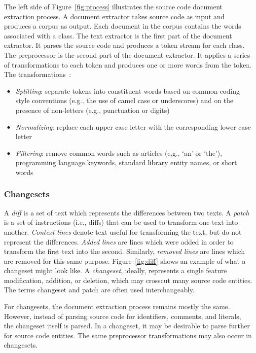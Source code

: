 The left side of Figure~\ref{fig:process} illustrates the source code document extraction process.
A document extractor takes source code as input and produces a corpus as output.
Each document in the corpus contains the words associated with a class.
The text extractor is the first part of the document extractor.
It parses the source code and produces a token stream for each class.
The preprocessor is the second part of the document extractor.
It applies a series of transformations to each token and
produces one or more words from the token.
The transformations~\cite{Marcus-etal:2004,Marcus-Menzies:2010}: %
\begin{itemize}
    \item {\it Splitting}: separate tokens into constituent words
        based on common coding style conventions (e.g., the use of camel case or underscores)
        and on the presence of non-letters (e.g., punctuation or digits)
    \item {\it Normalizing}: replace each upper case letter with the corresponding
        lower case letter
    \item {\it Filtering}: remove common words such as articles (e.g., `an' or `the'),
        programming language keywords, standard library entity names, or short words
\end{itemize}


\subsubsection{Changesets}

A \textit{diff} is a set of text which represents the differences between two texts.
A \textit{patch} is a set of instructions (i.e., diffs) that can be used to transform one text into another.
\textit{Context lines} denote text useful for transforming the text, but do not represent the differences.
\textit{Added lines} are lines which were added in order to transform the first text into the second.
Similarly, \textit{removed lines} are lines which are removed for this same purpose.
Figure~\ref{fig:diff} shows an example of what a changeset might look like.
A \textit{changeset}, ideally, represents a single feature modification, addition, or deletion, which may crosscut many source code entities.
The terms changeset and patch are often used interchangeably.

For changesets, the document extraction process remains mostly the same.
However, instead of parsing source code for identifiers, comments, and literals, the changeset itself is parsed.
In a changeset, it may be desirable to parse further for source code entities.
The same preprocessor transformations may also occur in changesets.


